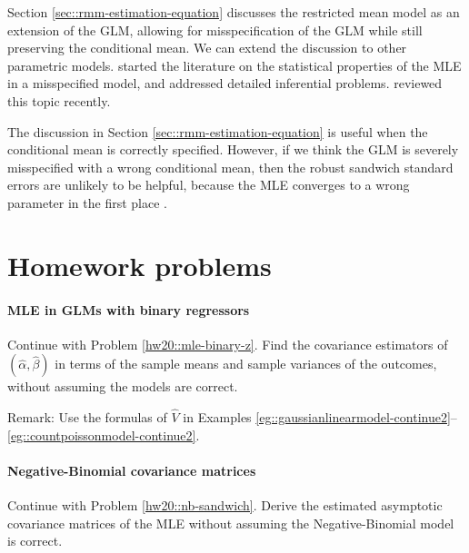 Section \ref{sec::rmm-estimation-equation} discusses the restricted mean model as an extension of the GLM, allowing for misspecification of the GLM while still preserving the conditional mean. We can extend the discussion to other parametric models. 
\citet{huber::1967} started the literature on the statistical properties of the MLE in a misspecified model, and
\citet{white1982maximum} addressed detailed inferential problems. 
\citet{buja2019models2} reviewed this topic recently. 



The discussion in Section \ref{sec::rmm-estimation-equation} is useful when the conditional mean is correctly specified. However, if we think the GLM is severely misspecified with a wrong conditional mean, then the robust sandwich standard errors are unlikely to be helpful, because the MLE converges to a wrong parameter in the first place \citep{freedman2006so}.  

 




\section{Homework problems}

 

\paragraph{MLE in GLMs with binary regressors}\label{hw20::mle-binary-z-misspecified}


Continue with Problem \ref{hw20::mle-binary-z}. Find the covariance estimators of $(\hat{\alpha}, \hat{\beta})$ in terms of the sample means and sample variances of the outcomes, without assuming the models are correct. 


 

Remark: Use the formulas of $\hat{V}$ in Examples \ref{eg::gaussianlinearmodel-continue2}--\ref{eg::countpoissonmodel-continue2}. 


 
\paragraph{Negative-Binomial covariance matrices}\label{hw20::nb-sandwich-misspecified}


Continue with Problem \ref{hw20::nb-sandwich}. Derive the estimated asymptotic covariance matrices of the MLE without assuming the Negative-Binomial model is correct. 

